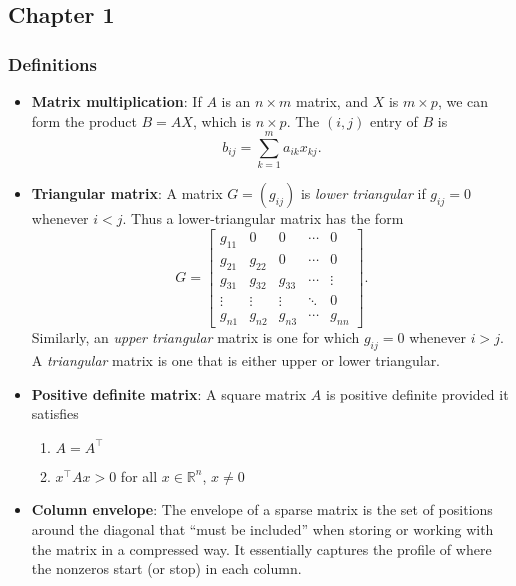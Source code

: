\documentclass{report}
\begin{document}
    \pagebreak 
    \subsection{Chapter 1}
    \bigbreak \noindent 
    \subsubsection{Definitions}
    \begin{itemize}
        \item \textbf{Matrix multiplication}: If $A$ is an $n \times m$ matrix, and $X$ is $m \times p$, we can form the product $B = AX$, which is $n \times p$. The $(i,j)$ entry of $B$ is
        \[
            b_{ij} = \sum_{k=1}^{m} a_{ik} x_{kj}.
        \]
    \item \textbf{Triangular matrix}:
        A matrix $G = (g_{ij})$ is \textit{lower triangular} if $g_{ij} = 0$ whenever $i < j$. 
        Thus a lower-triangular matrix has the form
        \[
            G =
            \begin{bmatrix}
                g_{11} & 0      & 0      & \cdots & 0 \\
                g_{21} & g_{22} & 0      & \cdots & 0 \\
                g_{31} & g_{32} & g_{33} & \cdots & \vdots \\
                \vdots & \vdots & \vdots & \ddots & 0 \\
                g_{n1} & g_{n2} & g_{n3} & \cdots & g_{nn}
            \end{bmatrix}.
        \]
        Similarly, an \textit{upper triangular} matrix is one for which $g_{ij} = 0$ whenever $i > j$. 
        A \textit{triangular} matrix is one that is either upper or lower triangular.
    \item \textbf{Positive definite matrix}: A square matrix $A$ is positive definite provided it satisfies
        \begin{enumerate}
            \item $A = A^{\top} $
            \item $x^{\top}Ax > 0$ for all $x\in \mathbb{R}^{n}$, $x\ne 0$
        \end{enumerate}
    \item \textbf{Column envelope}: The envelope of a sparse matrix is the set of positions around the diagonal that “must be included” when storing or working with the matrix in a compressed way.
        \bigbreak \noindent 
        It essentially captures the profile of where the nonzeros start (or stop) in each column.

\end{itemize}
\end{document}
